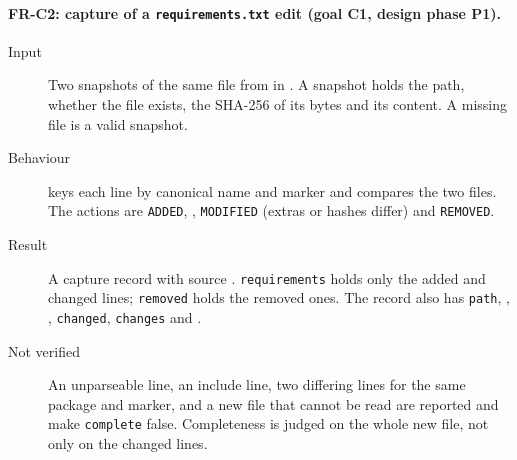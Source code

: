 \paragraph{FR-C2: capture of a \texttt{requirements.txt} edit (goal C1, design phase P1).}
\begin{sloppypar}
\begin{description}
    \item[Input] Two snapshots of the same file from  in . A snapshot holds the path, whether the file exists, the SHA-256 of its bytes and its content. A missing file is a valid snapshot.
    \item[Behaviour]  keys each line by canonical name and marker and compares the two files. The actions are \texttt{ADDED}, , \texttt{MODIFIED} (extras or hashes differ) and \texttt{REMOVED}.
    \item[Result] A capture record with source . \texttt{requirements} holds only the added and changed lines; \texttt{removed} holds the removed ones. The record also has \texttt{path}, , , \texttt{changed}, \texttt{changes} and .
    \item[Not verified] An unparseable line, an include line, two differing lines for the same package and marker, and a new file that cannot be read are reported and make \texttt{complete} false. Completeness is judged on the whole new file, not only on the changed lines.
\end{description}
\end{sloppypar}

